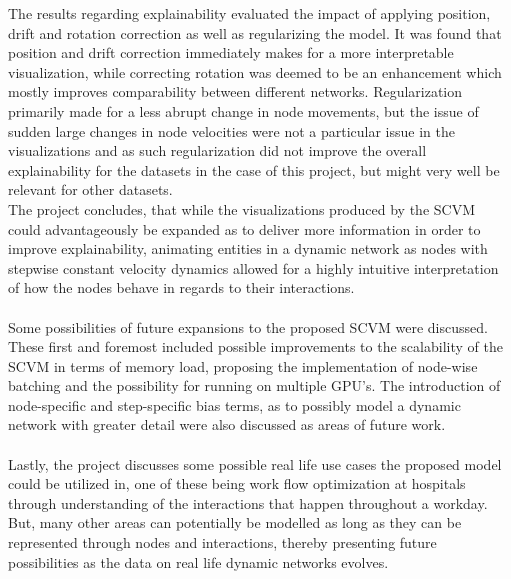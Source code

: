 The results regarding explainability evaluated the impact of applying position, drift and rotation correction as well as regularizing the model.
It was found that position and drift correction immediately makes for a more interpretable visualization, while correcting rotation was deemed to be an enhancement which mostly improves comparability between different networks.
Regularization primarily made for a less abrupt change in node movements, but the issue of sudden large changes in node velocities were not a particular issue in the visualizations and as such regularization did not improve the overall explainability for the datasets in the case of this project, but might very well be relevant for other datasets.
\\
The project concludes, that while the visualizations produced by the SCVM could advantageously be expanded as to deliver more information in order to improve explainability, animating entities in a dynamic network as nodes with stepwise constant velocity dynamics allowed for a highly intuitive interpretation of how the nodes behave in regards to their interactions. 
\\\\
Some possibilities of future expansions to the proposed SCVM were discussed.
These first and foremost included possible improvements to the scalability of the SCVM in terms of memory load, proposing the implementation of node-wise batching and the possibility for running on multiple GPU's.
The introduction of node-specific and step-specific bias terms, as to possibly model a dynamic network with greater detail were also discussed as areas of future work.
\\\\
Lastly, the project discusses some possible real life use cases the proposed model could be utilized in, one of these being work flow optimization at hospitals through understanding of the interactions that happen throughout a workday. But, many other areas can potentially be modelled as long as they can be represented through nodes and interactions, thereby presenting future possibilities as the data on real life dynamic networks evolves. 

